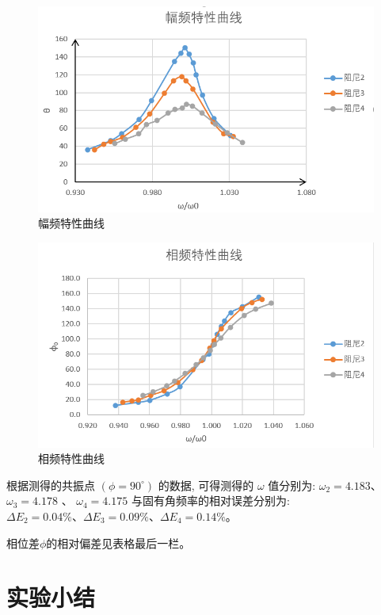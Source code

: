 \documentclass[UTF8]{ctexart}
\begin{document}
\begin{figure}[H]
    \centering
    \includegraphics[scale=1]{幅频特性曲线.png}
    \caption{幅频特性曲线}
    \label{fig:label}
\end{figure}


\begin{figure}[H]
    \centering
    \includegraphics[scale=1]{相频特性曲线.png}
    \caption{相频特性曲线}
    \label{fig:label}
\end{figure}

根据测得的共振点  $\left(\phi=90^{\circ}\right)$  的数据, 可得测得的  $\omega $ 值分别为: $ \omega_{2}=4.183 $、 $\omega_{3}=4.178$ 、 $\omega_{4}=4.175 $
与固有角频率的相对误差分别为:$\Delta E_{2}=0.04 \% 、 \Delta E_{3}=0.09 \% 、 \Delta E_{4}=0.14 \%$。

相位差$\phi$的相对偏差见表格最后一栏。

\section{实验小结}
\end{document}
